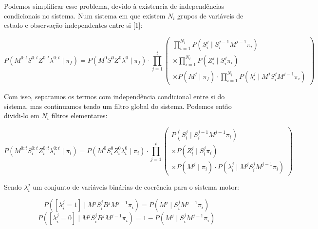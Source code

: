 Podemos simplificar esse problema, devido à existencia de independências condicionais no sistema. Num sistema em que existem $ N_i $ grupos de variáveis de estado e observação independentes entre si [1]:

\begin{equation}
    P \left( M^{0: t} S^{0: t} Z^{0: t} \lambda^{0: t}  \mid \pi_f \right) = P \left( M^0 S^0 Z^0 \lambda^0 \mid \pi_f \right) \cdot \prod\limits_{j =1}^{t} 
        \left(
            \begin{array}{l}
                \prod\limits_{i =1}^{N_i} P \left( S_i^j \mid S_i^{j -1} M^{j-1} \pi_i \right) \\
                \times \prod\limits_{i=1}^{N_i} P \left( Z_i^j \mid S_i^j \pi_i \right) \\
                \times P \left( M^j \mid \pi_f \right) \cdot \prod\limits_{i =1}^{N_i} P \left( \lambda_i^j \mid M^j S_i^j M^{j-1} \pi_i \right)
            \end{array}
        \right)
\end{equation}

Com isso, separamos os termos com independência condicional entre si do sistema, mas continuamos tendo um filtro global do sistema. Podemos então dividi-lo em $ N_i $ filtros elementares:

\begin{equation}
    P \left( M^{0: t} S_i^{0: t} Z_i^{0: t} \lambda_i^{0: t}  \mid \pi_i \right) = P \left( M^0 S_i^0 Z_i^0 \lambda_i^0 \mid \pi_i \right) \cdot \prod\limits_{j =1}^{t} 
        \left(
            \begin{array}{l}
                P \left( S_i^j \mid S_i^{j -1} M^{j-1} \pi_i \right) \\
                \times P \left( Z_i^j \mid S_i^j \pi_i \right) \\
                \times P \left( M^j \mid \pi_i \right) \cdot P \left( \lambda_i^j \mid M^j S_i^j M^{j-1} \pi_i \right)
            \end{array}
        \right)
\end{equation}

Sendo $ \lambda_i^j $ um conjunto de variáveis binárias de coerência para o sistema motor:

\begin{equation}
    P \left( \left[ \lambda_i^j = 1 \right] \mid M^j S_i^j B^j M^{j -1} \pi_i \right) = P \left( M^j \mid S_i^j M^{j -1} \pi_i \right)
\end{equation}
\begin{equation}
    P \left( \left[ \lambda_i^j = 0 \right] \mid M^j S_i^j B^j M^{j -1} \pi_i \right) = 1 - P \left( M^j \mid S_i^j M^{j -1} \pi_i \right)
\end{equation}

